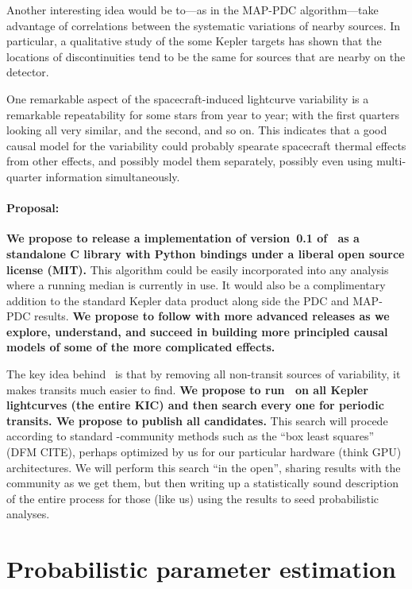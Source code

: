 \documentclass[letterpaper,12pt,preprint]{hack_aastex}
\newcommand{\Untrendy}{\package{Untrendy}}
\begin{document}
Another interesting idea would be to---as in the MAP-PDC algorithm---take
advantage of correlations between the systematic variations of nearby sources.
In particular, a qualitative study of the some Kepler targets has shown that
the locations of discontinuities tend to be the same for sources that are
nearby on the detector.

One remarkable aspect of the spacecraft-induced lightcurve variability is
a remarkable repeatability for some stars from year to year; with the
first quarters looking all very similar, and the second, and so on.
This indicates that a good causal model for the variability could probably
spearate spacecraft thermal effects from other effects, and possibly model
them separately, possibly even using multi-quarter information simultaneously.

\paragraph{Proposal:}
\textbf{We propose to release a implementation of version~0.1 of \Untrendy\ as a standalone C
library with Python bindings under a liberal open source license (MIT).}
This algorithm could be easily incorporated into any analysis where a running
median is currently in use.
It would also be a complimentary addition to the standard Kepler data
product along side the PDC and MAP-PDC results.
\textbf{We propose to follow with more advanced releases as we explore,
understand, and succeed in building more principled causal models of some
of the more complicated effects.}

The key idea behind \Untrendy\ is that by removing all non-transit
sources of variability, it makes transits much easier to find.
\textbf{We propose to run \Untrendy\ on all Kepler lightcurves (the
  entire KIC) and then search every one for periodic transits.  We
  propose to publish all candidates.}
This search will procede
according to standard \Kepler-community methods such as the ``box
least squares'' (DFM CITE), perhaps optimized by us for our particular
hardware (think GPU) architectures.
We will perform this search ``in
the open'', sharing results with the community as we get them, but
then writing up a statistically sound description of the entire
process for those (like us) using the results to seed probabilistic
analyses.

\section{Probabilistic parameter estimation}
\end{document}
